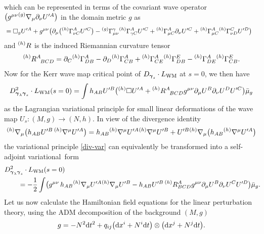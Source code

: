 \documentclass[11pt]{article}
\numberwithin{equation}{section}
\def\ptl{\partial}%
\def\mbo#1{\boldsymbol{#1}}%
\def\grad{{\nabla}}%
\newcommand{\leftexp}[2]{{\vphantom{#2}}^{#1}{#2}}
\def\halb{\frac{1}{2}}%
\numberwithin{equation}{section}
\begin{document}
which can be represented in terms of the covariant wave operator $\bigl(g^{\mu \nu}\leftexp{(g)}{\grad}_{\mu} \ptl_\nu U'^A\bigr)$ in the domain metric $g$ as
\begin{align*}
&{}= \square_g U'^A + g^{\mu \nu} \bigl(\ptl_\mu \bigl(\leftexp{(h)}{\Gamma}^A_{\nu C} U'^C\bigr) - \leftexp{(g)}{\Gamma}^\gamma_{\mu \nu} \leftexp{(h)}{\Gamma}^A_{\gamma C} U'^C + \leftexp{(h)}{\Gamma}^A_{\mu C} \ptl_\nu U'^C+ \leftexp{(h)}{\Gamma}^A_{\mu C} \leftexp{(h)}{\Gamma}^C_{\nu D} U'^D \bigr)
\end{align*}
and $\leftexp{(h)}{R}$ is the induced Riemannian curvature tensor
\[
 \leftexp{(h)}{R}^A_{\,\,\,\,BCD} = \ptl_C\leftexp{(h)}{\Gamma}^A_{DB} - \ptl_D\leftexp{(h)}{\Gamma}^A_{CB} + \leftexp{(h)}{\Gamma}^A_{CE} \leftexp{(h)}{\Gamma}^E_{DB} - \leftexp{(h)}{\Gamma}^A_{DE}\leftexp{(h)}{\Gamma}^E_{CB}.
\]
Now for the Kerr wave map critical point of $D_{\mbo{\gamma}_s} \cdot L_{{\rm WM}}$ at $s=0$, we then have
\begin{align} \label{div-var}
D^2_{\mbo{\gamma}_\lambda \mbo{\gamma}_s} \cdot L_{{\rm WM}} (s=0) = \int h_{AB} U'^B \bigl(\leftexp{(h)}{\square} U'^A + \leftexp{(h)}{R}^A_{\,\,\,\,BCD} g^{\mu \nu} \ptl_\mu U^B \ptl_\nu U^D U'^C\bigr) \bar{\mu}_g
\end{align}
as the Lagrangian variational principle for small linear deformations of the wave map $U_s \colon (M, g)\allowbreak \to (N, h)$.
In view of the divergence identity
\begin{align*}
\leftexp{(h)}{\grad}_\mu \bigl(h_{AB} U'^B \, \leftexp{(h)}{\grad}^\mu U'^A\bigr)= h_{AB} \leftexp{(h)}{\grad}^\mu U'^A \leftexp{(h)}{\grad}^{\mu} U'^B +
U'^B \leftexp{(h)}{\grad}_{\mu} \bigl(h_{AB} \leftexp{(h)}{\grad}^\mu U'^A\bigr)
\end{align*}
the variational principle \eqref{div-var} can equivalently be transformed into a self-adjoint variational~form
\begin{align}
& D^2_{\mbo{\gamma}_\lambda \mbo{\gamma}_s} \cdot L_{{\rm WM}} (s=0) \notag\\
&\qquad{}= - \halb \int \bigl(g^{\mu \nu}\, h_{AB}\leftexp{(h)}{\grad}_\mu U'^A \leftexp{(h)}{\grad}_\mu U'^B - h_{AB} U'^B \, \leftexp{(h)}{R}^A_{BCD} g^{\mu \nu} \ptl_\mu U^B \ptl_\nu U^C U'^D \bigr) \bar{\mu}_g.\!\!\label{quad-var}
\end{align}
Let us now calculate the Hamiltonian field equations for the linear perturbation theory, using the ADM decomposition of the background $(M, g)$
\begin{align*}
g = -N^2 {\rm d}t^2 + q_{ij} \bigl({\rm d}x^i + N^i {\rm d}t\bigr) \otimes \bigl({\rm d}x^j + N^j {\rm d}t\bigr).
\end{align*}
\end{document}
